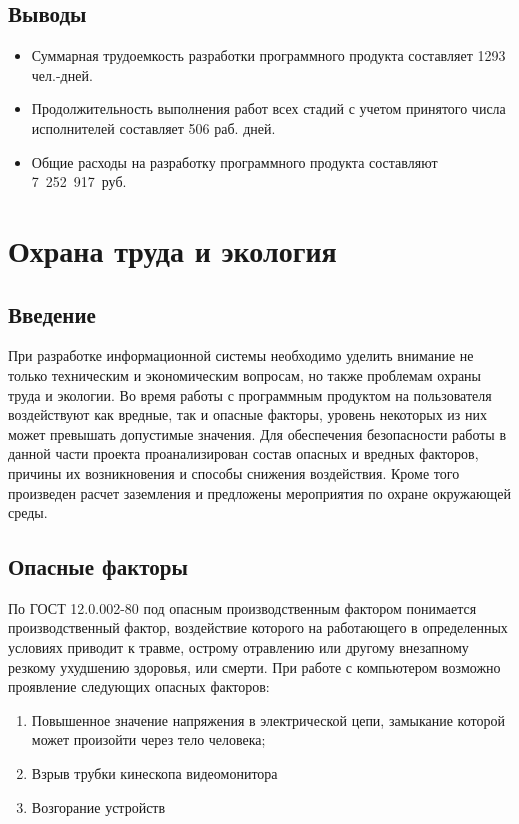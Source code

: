 \documentclass[14pt,oneside,final]{extreport}
\begin{document}
	\section{Выводы}		
		\begin{itemize}
			\item Суммарная трудоемкость разработки программного продукта составляет 1293 чел.-дней.
			\item Продолжительность выполнения работ всех стадий с учетом принятого числа исполнителей составляет 506 раб. дней.
			\item Общие расходы на разработку программного продукта составляют \mbox{7 252 917 руб.}
		\end{itemize}

	\chapter{Охрана труда и экология}
	\section{Введение}
	При разработке информационной системы необходимо уделить внимание не только техническим и экономическим вопросам, но также  проблемам охраны труда и экологии. Во время работы с программным продуктом на пользователя воздействуют как вредные, так и опасные факторы, уровень некоторых из них может превышать допустимые значения. Для обеспечения безопасности работы в данной части проекта проанализирован состав опасных и вредных факторов, причины их возникновения и способы снижения воздействия. Кроме того произведен расчет заземления и предложены мероприятия по охране окружающей среды.
	
	\section{Опасные факторы}
	По ГОСТ 12.0.002-80 под опасным производственным фактором понимается производственный фактор, воздействие которого на работающего в определенных условиях приводит к травме, острому отравлению или другому внезапному резкому ухудшению здоровья, или смерти. При работе с компьютером возможно проявление следующих опасных факторов:
	\begin{enumerate}
		\item Повышенное значение напряжения в электрической цепи, замыкание которой может произойти через тело человека;
		\item Взрыв трубки кинескопа видеомонитора
		\item Возгорание устройств 
	\end{enumerate}
	
\end{document}
